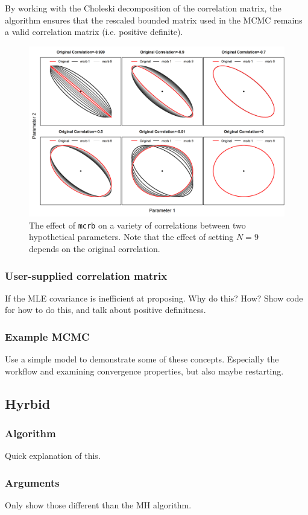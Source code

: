 \documentclass{article}\usepackage[]{graphicx}\usepackage[]{color}
\begin{document}
By working with the Choleski decomposition of the
correlation matrix, the algorithm ensures that the rescaled
bounded matrix used in the MCMC remains a valid correlation
matrix (i.e. positive definite).

\begin{figure}[h]
  \centering
  \includegraphics[width=5in]{plots/mcrb_examples.png}
  \caption{The effect of \texttt{mcrb} on a variety of
    correlations between two hypothetical parameters. Note
    that the effect of setting $N=9$ depends on the original
    correlation.}
  \label{fig:mcrb}
\end{figure}
\subsubsection{User-supplied correlation matrix}
If the MLE covariance is inefficient at proposing. Why do this?
How? Show code for how to do this, and talk about positive
definitness.
\subsubsection{Example MCMC}
Use a simple model to demonstrate some of these
concepts. Especially the workflow and examining convergence
properties, but also maybe restarting.
\subsection{Hyrbid}\label{sec:hybrid}
\subsubsection{Algorithm}
Quick explanation of this.
\subsubsection{Arguments}
Only show those different than the MH algorithm.
\end{document}
